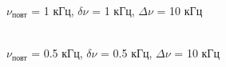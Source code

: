 \documentclass[a4paper,12pt]{article}
\begin{document}
\begin{enumerate}
\begin{figure}[h]
\begin{minipage}[h]{0.47\linewidth}
 $\nu_\text{повт}$  = 1 кГц, $\delta \nu$ = 1 кГц, $\Delta \nu$ = 10 кГц \\
\end{minipage}
\hfill
\begin{minipage}[h]{0.47\linewidth}
 \\ $\nu_\text{повт}$  = 0.5 кГц, $\delta \nu$ = 0.5 кГц, $\Delta \nu$ = 10 кГц
\end{minipage}
\vfill
\begin{minipage}[h]{0.47\linewidth}

\end{minipage}
\end{figure}
\end{enumerate}
\end{document}
